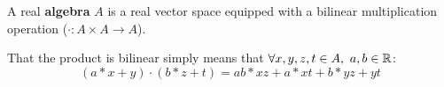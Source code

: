 \begin{definition}[Algebra]\label{d:algebra}
	A real \textbf{algebra} $A$ is a real vector space equipped with a bilinear multiplication operation ($\cdot : A\times A \to A$).

	That the product is bilinear simply means that $\forall x,y,z,t \in A,\ a,b \in \mathbb{R}$:
				\[(a*x + y)\cdot (b*z + t) = ab*xz + a*xt + b*yz + yt\]


\end{definition}
